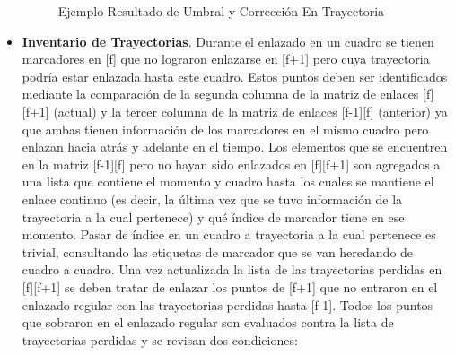 \begin{itemize}
\begin{figure}[ht!]
 \centering
 \caption{Ejemplo Resultado de Umbral y Corrección En Trayectoria}
\label{distro_acc_track_m13_fix}
\end{figure}
\item \textbf{Inventario de Trayectorias}. Durante el enlazado en un cuadro se tienen marcadores en [f] que no lograron enlazarse en [f+1] pero cuya trayectoria podría estar enlazada hasta este cuadro.
Estos puntos deben ser identificados mediante la comparación de la segunda columna de la matriz de enlaces [f][f+1] (actual) y la tercer columna de la matriz de enlaces [f-1][f] (anterior) ya que ambas tienen información de los marcadores en el mismo cuadro pero enlazan hacia atrás y adelante en el tiempo.
Los elementos que se encuentren en la matriz [f-1][f] pero no hayan sido enlazados en [f][f+1] son agregados a una lista que contiene el momento y cuadro hasta los cuales se mantiene el enlace continuo (es decir, la última vez que se tuvo información de la trayectoria a la cual pertenece) y qué índice de marcador tiene en ese momento. Pasar de índice en un cuadro a trayectoria a la cual pertenece es trivial, consultando las etiquetas de marcador que se van heredando de cuadro a cuadro.
Una vez actualizada la lista de las trayectorias perdidas en [f][f+1] se deben tratar de enlazar los puntos de [f+1] que no entraron en el enlazado regular con las trayectorias perdidas hasta [f-1]. Todos los puntos que sobraron en el enlazado regular son evaluados contra la lista de trayectorias perdidas y se revisan dos condiciones:


\end{itemize}
